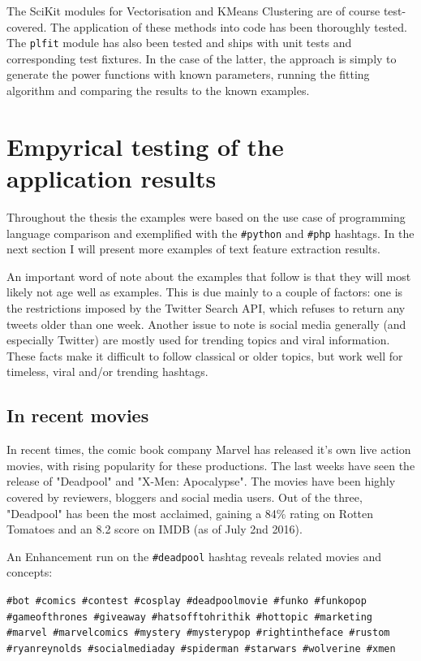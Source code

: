 \documentclass[12pt,a4paper,twoside]{report}
\begin{document}
The SciKit modules for Vectorisation and KMeans Clustering are of course test-covered. The application of these methods into code has been thoroughly tested. The \texttt{plfit} module has also been tested and ships with unit tests and corresponding test fixtures. In the case of the latter, the approach is simply to generate the power functions with known parameters, running the fitting algorithm and comparing the results to the known examples.

\section{Empyrical testing of the application results}
Throughout the thesis the examples were based on the use case of programming language comparison and exemplified with the \texttt{\#python} and \texttt{\#php} hashtags. In the next section I will present more examples of text feature extraction results.

An important word of note about the examples that follow is that they will most likely not age well as examples. This is due mainly to a couple of factors: one is the restrictions imposed by the Twitter Search API, which refuses to return any tweets older than one week. Another issue to note is social media generally (and especially Twitter) are mostly used for trending topics and viral information. These facts make it difficult to follow classical or older topics, but work well for timeless, viral and/or trending hashtags.

\subsection{In recent movies}
In recent times, the comic book company Marvel has released it's own live action movies, with rising popularity for these productions. The last weeks have seen the release of "Deadpool" and "X-Men: Apocalypse". The movies have been highly covered by reviewers, bloggers and social media users. Out of the three, "Deadpool" has been the most acclaimed, gaining a 84\% rating on Rotten Tomatoes and an 8.2 score on IMDB (as of July 2nd 2016).

An Enhancement run on the \texttt{\#deadpool} hashtag reveals related movies and concepts:

\texttt{\#bot \#comics \#contest \#cosplay \#deadpoolmovie \#funko \#funkopop \#gameofthrones \#giveaway \#hatsofftohrithik \#hottopic \#marketing \#marvel \#marvelcomics \#mystery \#mysterypop \#rightintheface \#rustom \#ryanreynolds \#socialmediaday \#spiderman \#starwars \#wolverine \#xmen}
\end{document}
